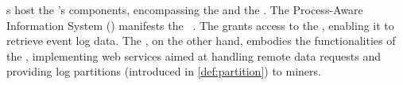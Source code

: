 s host the 's components, encompassing the  and the . 
The Process-Aware Information System () manifests the ~\citep{Dumas.etal/2018:FundamentalsofBPM}. %
%
%
The  grants access to the , enabling it to retrieve event log data. The , on the other hand, embodies the functionalities of the , implementing web services aimed at handling remote data requests and providing log partitions (introduced in \cref{def:partition}) to miners. %

